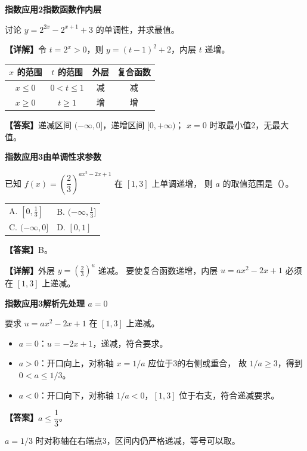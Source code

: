 \documentclass[UTF8,10pt,aspectratio=169]{ctexbeamer}
\makeatletter
\newcommand{\PageHeading}[1]{\begin{center}{\Large\bfseries #1}\end{center}\vspace{0.2cm}}
\newcommand{\Answer}[1]{\par\vspace{0.2cm}\textbf{【答案】}#1}
\newcommand{\Analysis}[1]{\par\vspace{0.2cm}\textbf{【详解】}#1}
\newcommand{\Choices}[4]{\par\vspace{0.2cm}\begin{tabular}{@{}p{0.47\textwidth}p{0.47\textwidth}@{}}A. #1 & B. #2 \\[0.15cm] C. #3 & D. #4\end{tabular}}
\makeatother
\begin{document}
\begin{frame}[t,label=F18]
  \PageHeading{指数应用2\quad 指数函数作内层}
  讨论 $y=2^{2x}-2^{x+1}+3$ 的单调性，并求最值。
  \pause
  \Analysis{令 $t=2^x>0$，则 $y=(t-1)^2+2$，内层 $t$ 递增。
  \begin{center}
  \renewcommand{\arraystretch}{1.4}
  \begin{tabular}{c|c|c|c}
    $x$ 的范围 & $t$ 的范围 & 外层 & 复合函数\\\hline
    $x\le0$ & $0<t\le1$ & 减 & 减\\
    $x\ge0$ & $t\ge1$ & 增 & 增
  \end{tabular}
  \end{center}}
  \Answer{递减区间 $(-\infty,0]$，递增区间 $[0,+\infty)$；
  $x=0$ 时取最小值2，无最大值。}
\end{frame}

\begin{frame}[t,label=F19]
  \PageHeading{指数应用3\quad 由单调性求参数}
  已知 $f(x)=\left(\dfrac23\right)^{ax^2-2x+1}$ 在 $[1,3]$ 上单调递增，
  则 $a$ 的取值范围是（\quad）。
  \Choices{$[0,\frac13]$}{$(-\infty,\frac13]$}{$(-\infty,0]$}{$[0,1]$}
  \pause
  \Answer{B。}
  \Analysis{外层 $y=(\frac23)^u$ 递减。
  要使复合函数递增，内层 $u=ax^2-2x+1$ 必须在 $[1,3]$ 上递减。}
\end{frame}

\begin{frame}[t,label=F20]
  \PageHeading{指数应用3解析\quad 先处理 $a=0$}
  要求 $u=ax^2-2x+1$ 在 $[1,3]$ 上递减。
  \pause
  \begin{itemize}
    \item $a=0$：$u=-2x+1$，递减，符合要求。
    \item $a>0$：开口向上，对称轴 $x=1/a$ 应位于3的右侧或重合，
      故 $1/a\ge3$，得到 $0<a\le1/3$。
    \item $a<0$：开口向下，对称轴 $1/a<0$，$[1,3]$ 位于右支，符合递减要求。
  \end{itemize}
  \Answer{$a\le\dfrac13$。}
  \par $a=1/3$ 时对称轴在右端点3，区间内仍严格递减，等号可以取。
\end{frame}
\end{document}
